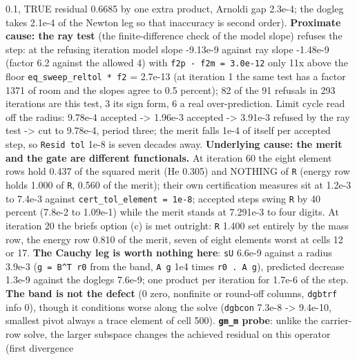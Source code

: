 \documentclass[english,a4paper]{my_memo}
\begin{document}
\begin{itemize}
  0.1, TRUE residual 0.6685 by one extra product, Arnoldi gap 2.3e-4; the
  dogleg takes 2.1e-4 of the Newton leg so that inaccuracy is second
  order). \textbf{Proximate cause: the ray test} (the finite-difference check of
  the model slope) refuses the step: at the refusing iteration model slope
  -9.13e-9 against ray slope -1.48e-9 (factor 6.2 against the allowed 4)
  with \texttt{\textbar{}f2p\ -\ f2m\textbar{}\ =\ 3.0e-12} only 11x above the floor
  \texttt{eq\_sweep\_reltol\ *\ \textbar{}f2\textbar{}} = 2.7e-13 (at iteration 1 the same test has a
  factor 1371 of room and the slopes agree to 0.5 percent); 82 of the 91
  refusals in 293 iterations are this test, 3 its sign form, 6 a real
  over-prediction. Limit cycle read off the radius: 9.78e-4 accepted -\textgreater{}
  1.96e-3 accepted -\textgreater{} 3.91e-3 refused by the ray test -\textgreater{} cut to 9.78e-4,
  period three; the merit falls 1e-4 of itself per accepted step, so
  \texttt{Resid\ tol} 1e-8 is seven decades away. \textbf{Underlying cause: the merit and
  the gate are different functionals.} At iteration 60 the eight element
  rows hold 0.437 of the squared merit (He 0.305) and NOTHING of \texttt{\textbar{}\textbar{}R\textbar{}\textbar{}}
  (energy row holds 1.000 of \texttt{\textbar{}\textbar{}R\textbar{}\textbar{}}, 0.560 of the merit); their own
  certification measures sit at 1.2e-3 to 7.4e-3 against
  \texttt{cert\_tol\_element\ =\ 1e-8}; accepted steps swing \texttt{\textbar{}\textbar{}R\textbar{}\textbar{}} by 40 percent
  (7.8e-2 to 1.09e-1) while the merit stands at 7.291e-3 to four digits.
  At iteration 20 the brief\textquotesingle s option (c) is met outright: \texttt{\textbar{}\textbar{}R\textbar{}\textbar{}} 1.400 set
  entirely by the mass row, the energy row 0.810 of the merit, seven of
  eight elements worst at cells 12 or 17. \textbf{The Cauchy leg is worth
  nothing here}: \texttt{\textbar{}\textbar{}sU\textbar{}\textbar{}} 6.6e-9 against a radius 3.9e-3 (\texttt{g\ =\ B\^{}T\ r0}
  from the band, \texttt{\textbar{}\textbar{}A\ g\textbar{}\textbar{}} 1e4 times \texttt{r0\ .\ A\ g}), predicted decrease
  1.3e-9 against the dogleg\textquotesingle s 7.6e-9; one product per iteration for
  1.7e-6 of the step. \textbf{The band is not the defect} (0 zero, nonfinite or
  round-off columns, \texttt{dgbtrf} info 0), though it conditions worse along the
  solve (\texttt{dgbcon} 7.3e-8 -\textgreater{} 9.4e-10, smallest pivot always a trace element
  of cell 500). \textbf{\texttt{gm\_m} probe}: unlike the carrier-row solve, the larger
  subspace changes the achieved residual on this operator (first divergence

\end{itemize}
\end{document}
